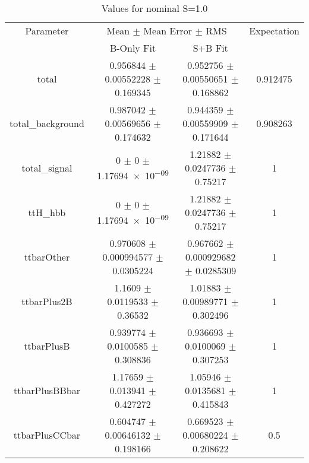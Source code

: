 \begin{table}
\centering
\caption{Values for nominal S=1.0}
\begin{tabular}{cccc}
\toprule
Parameter & \multicolumn{2}{c}{Mean $\pm$ Mean Error $\pm$ RMS} & Expectation\\
 & B-Only Fit & S+B Fit & \\
\midrule
total & \num{0.956844} $\pm$ \num{0.00552228} $\pm$ \num{0.169345} & \num{0.952756} $\pm$ \num{0.00550651} $\pm$ \num{0.168862} & \num{0.912475}\\
total\_background & \num{0.987042} $\pm$ \num{0.00569656} $\pm$ \num{0.174632} & \num{0.944359} $\pm$ \num{0.00559909} $\pm$ \num{0.171644} & \num{0.908263}\\
total\_signal & \num{0} $\pm$ \num{0} $\pm$ \num{1.17694e-09} & \num{1.21882} $\pm$ \num{0.0247736} $\pm$ \num{0.75217} & \num{1}\\
ttH\_hbb & \num{0} $\pm$ \num{0} $\pm$ \num{1.17694e-09} & \num{1.21882} $\pm$ \num{0.0247736} $\pm$ \num{0.75217} & \num{1}\\
ttbarOther & \num{0.970608} $\pm$ \num{0.000994577} $\pm$ \num{0.0305224} & \num{0.967662} $\pm$ \num{0.000929682} $\pm$ \num{0.0285309} & \num{1}\\
ttbarPlus2B & \num{1.1609} $\pm$ \num{0.0119533} $\pm$ \num{0.36532} & \num{1.01883} $\pm$ \num{0.00989771} $\pm$ \num{0.302496} & \num{1}\\
ttbarPlusB & \num{0.939774} $\pm$ \num{0.0100585} $\pm$ \num{0.308836} & \num{0.936693} $\pm$ \num{0.0100069} $\pm$ \num{0.307253} & \num{1}\\
ttbarPlusBBbar & \num{1.17659} $\pm$ \num{0.013941} $\pm$ \num{0.427272} & \num{1.05946} $\pm$ \num{0.0135681} $\pm$ \num{0.415843} & \num{1}\\
ttbarPlusCCbar & \num{0.604747} $\pm$ \num{0.00646132} $\pm$ \num{0.198166} & \num{0.669523} $\pm$ \num{0.00680224} $\pm$ \num{0.208622} & \num{0.5}\\
\bottomrule
\end{tabular}
\end{table}